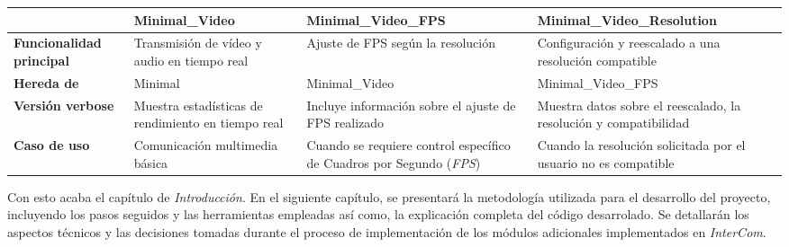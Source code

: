 \begin{center}
\label{tab:modulos}
\begin{tabular}{|p{2.6cm}|p{4cm}|p{4cm}|p{5cm}|}
    \cline{2-4} %
    \multicolumn{1}{c|}{} & %
    \textbf{Minimal\_Video} & 
    \textbf{Minimal\_Video\_FPS} & 
    \textbf{Minimal\_Video\_Resolution} \\
    \hline
    \textbf{Funcionalidad principal} & 
    Transmisión de vídeo y audio en tiempo real & 
    Ajuste de FPS según la resolución & 
    Configuración y reescalado a una resolución compatible \\
    \hline
    \textbf{Hereda de} & 
    Minimal & 
    Minimal\_Video & 
    Minimal\_Video\_FPS \\
    \hline
    \textbf{Versión verbose} & 
    Muestra estadísticas de rendimiento en tiempo real & 
    Incluye información sobre el ajuste de FPS realizado & 
    Muestra datos sobre el reescalado, la resolución y compatibilidad \\
    \hline

    \textbf{Caso de uso} & 
    Comunicación multimedia básica & 
    Cuando se requiere control específico de Cuadros por Segundo (\textit{FPS}) & 
    Cuando la resolución solicitada por el usuario no es compatible \\
    \hline
\end{tabular}
\end{center}
\vspace{\baselineskip}

Con esto acaba el capítulo de \textit{Introducción}. En el siguiente capítulo, se presentará la metodología utilizada para el desarrollo del proyecto, incluyendo los pasos seguidos y las herramientas empleadas así como, la explicación completa del código desarrolado. Se detallarán los aspectos técnicos y las decisiones tomadas durante el proceso de implementación de los módulos adicionales implementados en \textit{InterCom}.